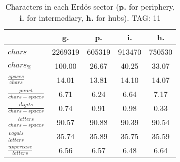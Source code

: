\begin{table}[h!]
\begin{center}
\begin{tabular}{| l || c | c | c | c |}\hline
 & {\bf g.} & {\bf p.} & {\bf i.} & {\bf h.} \\\hline\hline
$chars$ & 2269319  & 605319  & 913470  & 750530 \\
$chars_{\%}$ & 100.00  & 26.67  & 40.25  & 33.07 \\\hline
$\frac{spaces}{chars}$ & 14.01  & 13.81  & 14.10  & 14.07 \\
$\frac{punct}{chars-spaces}$ & 6.71  & 6.24  & 6.64  & 7.17 \\
$\frac{digits}{chars-spaces}$ & 0.74  & 0.91  & 0.98  & 0.33 \\\hline
$\frac{letters}{chars-spaces}$ & 90.57  & 90.88  & 90.39  & 90.54 \\
$\frac{vogals}{letters}$ & 35.74  & 35.89  & 35.75  & 35.59 \\
$\frac{uppercase}{letters}$ & 6.56  & 6.57  & 6.48  & 6.64 \\\hline
\end{tabular}
\caption{Characters in each Erd\"os sector ({{\bf p.}} for periphery, {{\bf i.}} for intermediary, 
    {{\bf h.}} for hubs). TAG: 11}
\end{center}
\end{table}